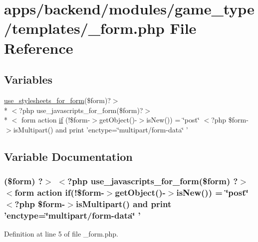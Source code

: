 \hypertarget{backend_2modules_2game__type_2templates_2__form_8php}{\section{apps/backend/modules/game\-\_\-type/templates/\-\_\-form.php File Reference}
\label{backend_2modules_2game__type_2templates_2__form_8php}
}
\subsection*{Variables}
\begin{DoxyCompactItemize}
\item 
\hyperlink{live_2modules_2user_2templates_2__form_8php_a86bc4522fdbe625b07bc4a4d6eec3df7}{use\-\_\-stylesheets\-\_\-for\-\_\-form}(\$form)?$>$\\*
$<$?php use\-\_\-javascripts\-\_\-for\-\_\-form(\$form)?$>$\\*
$<$ form action \hyperlink{backend_2modules_2game__type_2templates_2__form_8php_ae30a307b320d8da5d9a945eaf68f7549}{if} (!\$form-\/$>$get\-Object()-\/$>$is\-New()) = \char`\"{}post\char`\"{} $<$?php \$form-\/$>$is\-Multipart() and print 'enctype=\char`\"{}multipart/form-\/data\char`\"{} '
\end{DoxyCompactItemize}


\subsection{Variable Documentation}
\hypertarget{backend_2modules_2game__type_2templates_2__form_8php_ae30a307b320d8da5d9a945eaf68f7549}{
\subsubsection[{if}]{ (\$form) ?$>$ $<$?php use\-\_\-javascripts\-\_\-for\-\_\-form(\$form) ?$>$ $<$form action if(!\$form-\/$>$get\-Object()-\/$>$is\-New()) = \char`\"{}post\char`\"{} $<$?php \$form-\/$>$is\-Multipart() and print 'enctype=\char`\"{}multipart/form-\/data\char`\"{} '}}\label{backend_2modules_2game__type_2templates_2__form_8php_ae30a307b320d8da5d9a945eaf68f7549}


Definition at line 5 of file \-\_\-form.\-php.

